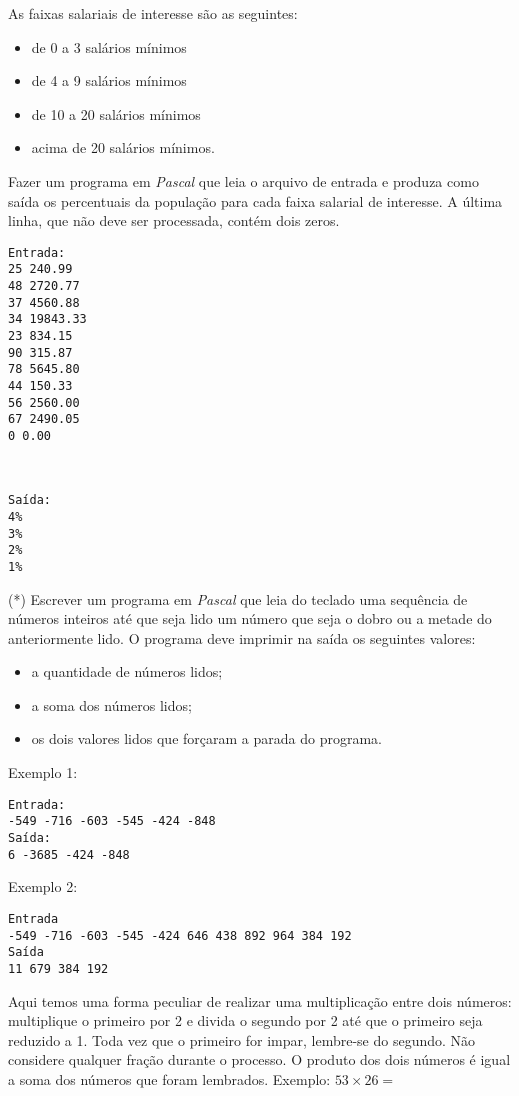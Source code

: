As faixas salariais de interesse são as seguintes:
\begin{itemize}
\item de 0 a 3 salários mínimos
\item de 4 a 9 salários mínimos
\item de 10 a 20 salários mínimos
\item acima de 20 salários mínimos.
\end{itemize}
Fazer um programa em \emph{Pascal} que leia o arquivo de entrada e produza como
saída os percentuais da população para cada faixa salarial
de interesse. A última linha, que não deve ser processada, contém dois zeros.

\begin{minipage}{5cm}
\begin{verbatim}
Entrada:
25 240.99
48 2720.77
37 4560.88
34 19843.33
23 834.15
90 315.87
78 5645.80
44 150.33
56 2560.00
67 2490.05
0 0.00  
\end{verbatim}
\end{minipage} \
\begin{minipage}{5cm}
\begin{verbatim}
Saída:
4%
3%
2%
1%
\end{verbatim}
\end{minipage}

\item (*) Escrever um programa em \emph{Pascal} que leia do teclado
uma sequência de números inteiros até que seja lido um número
que seja o dobro ou a metade do anteriormente lido.
O programa deve imprimir na saída os seguintes valores:
\begin{itemize}
\item a quantidade de números lidos;
\item a soma dos números lidos;
\item os dois valores lidos que forçaram a parada do programa.
\end{itemize}

Exemplo 1:
\begin{verbatim}
Entrada:
-549 -716 -603 -545 -424 -848
Saída:
6 -3685 -424 -848
\end{verbatim}

Exemplo 2:
\begin{verbatim}
Entrada
-549 -716 -603 -545 -424 646 438 892 964 384 192
Saída
11 679 384 192
\end{verbatim}

\item  Aqui temos uma forma peculiar de realizar uma multiplicação entre
dois números: multiplique o primeiro por 2 e divida o segundo por 2
até que o primeiro seja reduzido a 1. Toda vez que o primeiro for
impar, lembre-se do segundo. Não considere qualquer fração durante
o processo. O produto dos dois números é igual a soma dos números
que foram lembrados. Exemplo: $53 \times 26 =$

